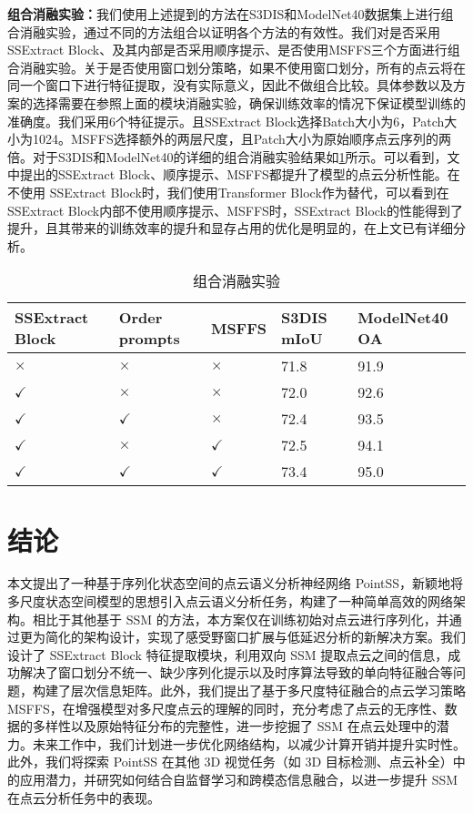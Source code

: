 \documentclass[preprint,12pt]{elsarticle}
\begin{document}
\textbf{组合消融实验：}我们使用上述提到的方法在S3DIS和ModelNet40数据集上进行组合消融实验，通过不同的方法组合以证明各个方法的有效性。我们对是否采用SSExtract Block、及其内部是否采用顺序提示、是否使用MSFFS三个方面进行组合消融实验。关于是否使用窗口划分策略，如果不使用窗口划分，所有的点云将在同一个窗口下进行特征提取，没有实际意义，因此不做组合比较。具体参数以及方案的选择需要在参照上面的模块消融实验，确保训练效率的情况下保证模型训练的准确度。我们采用6个特征提示。且SSExtract Block选择Batch大小为6，Patch大小为1024。MSFFS选择额外的两层尺度，且Patch大小为原始顺序点云序列的两倍。对于S3DIS和ModelNet40的详细的组合消融实验结果如\cref{tab:combine}所示。可以看到，文中提出的SSExtract Block、顺序提示、MSFFS都提升了模型的点云分析性能。在不使用
SSExtract Block时，我们使用Transformer Block作为替代，可以看到在SSExtract Block内部不使用顺序提示、MSFFS时，SSExtract Block的性能得到了提升，且其带来的训练效率的提升和显存占用的优化是明显的，在上文已有详细分析。
\begin{table}[htbp!]
	\centering
	\caption{组合消融实验}
	\label{tab:combine}
	\begin{tabular}{@{}lllll@{}}
		\toprule
		SSExtract Block  &Order prompts  & MSFFS  &S3DIS mIoU & ModelNet40 OA\\ 
		\midrule
		$\times$             & $\times$        & $\times$             & 71.8     & 91.9\\
		$\checkmark$             & $\times$        & $\times$             & 72.0     & 92.6\\
		$\checkmark$     & $\checkmark$       & $\times$                &  72.4         & 93.5 \\
		$\checkmark$       & $\times$         & $\checkmark$                 &  72.5    & 94.1     \\
		$\checkmark$     & $\checkmark$       & $\checkmark$                &  73.4     & 95.0     \\ 
		\bottomrule
	\end{tabular}
\end{table}
\section{结论}
本文提出了一种基于序列化状态空间的点云语义分析神经网络 PointSS，新颖地将多尺度状态空间模型的思想引入点云语义分析任务，构建了一种简单高效的网络架构。相比于其他基于 SSM 的方法，本方案仅在训练初始对点云进行序列化，并通过更为简化的架构设计，实现了感受野窗口扩展与低延迟分析的新解决方案。我们设计了 SSExtract Block 特征提取模块，利用双向 SSM 提取点云之间的信息，成功解决了窗口划分不统一、缺少序列化提示以及时序算法导致的单向特征融合等问题，构建了层次信息矩阵。此外，我们提出了基于多尺度特征融合的点云学习策略 MSFFS，在增强模型对多尺度点云的理解的同时，充分考虑了点云的无序性、数据的多样性以及原始特征分布的完整性，进一步挖掘了 SSM 在点云处理中的潜力。未来工作中，我们计划进一步优化网络结构，以减少计算开销并提升实时性。此外，我们将探索 PointSS 在其他 3D 视觉任务（如 3D 目标检测、点云补全）中的应用潜力，并研究如何结合自监督学习和跨模态信息融合，以进一步提升 SSM 在点云分析任务中的表现。
\end{document}
